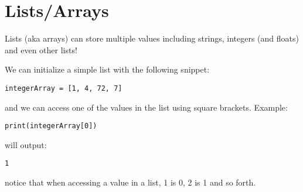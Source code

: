 \section*{Lists/Arrays}
Lists (aka arrays) can store multiple values including strings, integers (and floats) and even other lists!

We can initialize a simple list with the following snippet:
\begin{lstlisting}
integerArray = [1, 4, 72, 7]
\end{lstlisting}
and we can access one of the values in the list using square brackets.
Example:
\begin{lstlisting}
print(integerArray[0])
\end{lstlisting}
will output:
\begin{lstlisting}[language=Text]
1
\end{lstlisting}
notice that when accessing a value in a list, 1 is 0, 2 is 1 and so forth.

